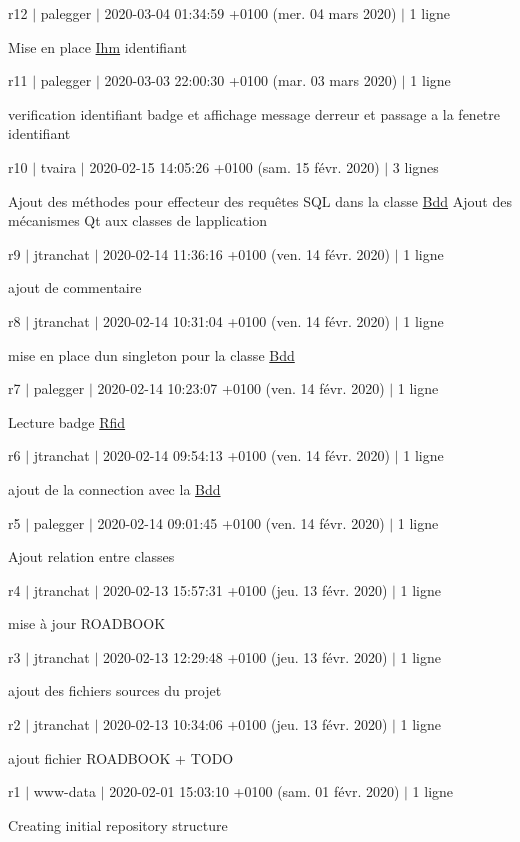 r12 $\vert$ palegger $\vert$ 2020-\/03-\/04 01\+:34\+:59 +0100 (mer. 04 mars 2020) $\vert$ 1 ligne

Mise en place \hyperlink{class_ihm}{Ihm} identifiant

r11 $\vert$ palegger $\vert$ 2020-\/03-\/03 22\+:00\+:30 +0100 (mar. 03 mars 2020) $\vert$ 1 ligne

verification identifiant badge et affichage message d\textquotesingle{}erreur et passage a la fenetre identifiant

r10 $\vert$ tvaira $\vert$ 2020-\/02-\/15 14\+:05\+:26 +0100 (sam. 15 févr. 2020) $\vert$ 3 lignes

Ajout des méthodes pour effecteur des requêtes S\+QL dans la classe \hyperlink{class_bdd}{Bdd} Ajout des mécanismes Qt aux classes de l\textquotesingle{}application

r9 $\vert$ jtranchat $\vert$ 2020-\/02-\/14 11\+:36\+:16 +0100 (ven. 14 févr. 2020) $\vert$ 1 ligne

ajout de commentaire

r8 $\vert$ jtranchat $\vert$ 2020-\/02-\/14 10\+:31\+:04 +0100 (ven. 14 févr. 2020) $\vert$ 1 ligne

mise en place d\textquotesingle{}un singleton pour la classe \hyperlink{class_bdd}{Bdd}

r7 $\vert$ palegger $\vert$ 2020-\/02-\/14 10\+:23\+:07 +0100 (ven. 14 févr. 2020) $\vert$ 1 ligne

Lecture badge \hyperlink{class_rfid}{Rfid}

r6 $\vert$ jtranchat $\vert$ 2020-\/02-\/14 09\+:54\+:13 +0100 (ven. 14 févr. 2020) $\vert$ 1 ligne

ajout de la connection avec la \hyperlink{class_bdd}{Bdd}

r5 $\vert$ palegger $\vert$ 2020-\/02-\/14 09\+:01\+:45 +0100 (ven. 14 févr. 2020) $\vert$ 1 ligne

Ajout relation entre classes

r4 $\vert$ jtranchat $\vert$ 2020-\/02-\/13 15\+:57\+:31 +0100 (jeu. 13 févr. 2020) $\vert$ 1 ligne

mise à jour R\+O\+A\+D\+B\+O\+OK

r3 $\vert$ jtranchat $\vert$ 2020-\/02-\/13 12\+:29\+:48 +0100 (jeu. 13 févr. 2020) $\vert$ 1 ligne

ajout des fichiers sources du projet

r2 $\vert$ jtranchat $\vert$ 2020-\/02-\/13 10\+:34\+:06 +0100 (jeu. 13 févr. 2020) $\vert$ 1 ligne

ajout fichier R\+O\+A\+D\+B\+O\+OK + T\+O\+DO

r1 $\vert$ www-\/data $\vert$ 2020-\/02-\/01 15\+:03\+:10 +0100 (sam. 01 févr. 2020) $\vert$ 1 ligne

Creating initial repository structure 